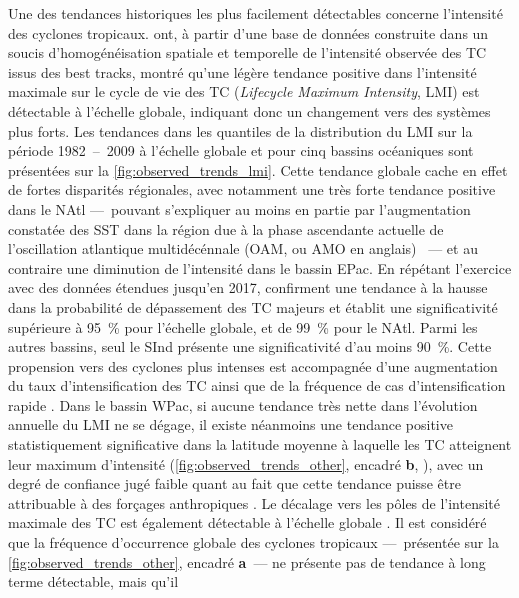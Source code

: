 \documentclass[../main.tex]{subfiles}
\begin{document}
Une des tendances historiques les plus facilement détectables concerne l'intensité des cyclones tropicaux. \textcite{kossin_trend_2013} ont, à partir d'une base
de données construite dans un soucis d'homogénéisation spatiale et temporelle de l'intensité observée des TC issus des best tracks, montré qu'une légère
tendance positive dans l'intensité maximale sur le cycle de vie des TC (\textit{Lifecycle Maximum Intensity}, LMI) est détectable à l'échelle globale, indiquant
donc un changement vers des systèmes plus forts. Les tendances dans les quantiles de la distribution du LMI sur la période \num{1982}~--~\num{2009} à l'échelle
globale et pour cinq bassins océaniques sont présentées sur la \cref{fig:observed_trends_lmi}. Cette tendance globale cache en effet de fortes disparités
régionales, avec notamment une très forte tendance positive dans le NAtl ---~pouvant s'expliquer au moins en partie par l'augmentation constatée des SST dans la
région due à la phase ascendante actuelle de l'oscillation atlantique multidécénnale (OAM, ou AMO en anglais) \parencite{ting_forced_2009}~--- et au contraire
une diminution de l'intensité dans le bassin EPac. En répétant l'exercice avec des données étendues jusqu'en \num{2017}, \textcite{kossin_global_2020}
confirment une tendance à la hausse dans la probabilité de dépassement des TC majeurs et établit une significativité supérieure à \SI{95}{\percent} pour
l'échelle globale, et de \SI{99}{\percent} pour le NAtl. Parmi les autres bassins, seul le SInd présente une significativité d'au moins \SI{90}{\percent}. Cette
propension vers des cyclones plus intenses est accompagnée d'une augmentation du taux d'intensification des TC ainsi que de la fréquence de cas
d'intensification rapide \parencite{balaguru_increasing_2018,kishtawal_tropical_2012}. Dans le bassin WPac, si aucune tendance très nette dans l'évolution
annuelle du LMI ne se dégage, il existe néanmoins une tendance positive statistiquement significative dans la latitude moyenne à laquelle les TC atteignent leur
maximum d'intensité (\cref{fig:observed_trends_other}, encadré \textbf{b}, \hbox{\cite{kossin_comment_2018}}), avec un degré de confiance jugé faible quant au
fait que cette tendance puisse être attribuable à des forçages anthropiques \parencite{knutson_tropical_2019}. Le décalage vers les pôles de l'intensité
maximale des TC est également détectable à l'échelle globale \parencite{kossin_poleward_2014}. Il est considéré que la fréquence d'occurrence globale des
cyclones tropicaux ---~présentée sur la \cref{fig:observed_trends_other}, encadré \textbf{a}~--- ne présente pas de tendance à long terme détectable, mais qu'il
\end{document}
